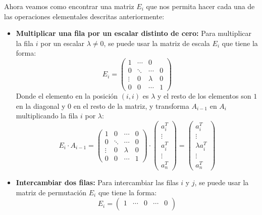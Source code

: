 \begin{proposición}
    Ahora veamos como encontrar una matriz $E_i$ que nos permita hacer cada una de las operaciones elementales descritas anteriormente:
    \begin{itemize}
        \item \textbf{Multiplicar una fila por un escalar distinto de cero:} Para multiplicar la fila $i$ por un escalar $\lambda \neq 0$, se puede usar la matriz de escala $E_i$ que tiene la forma:
        \[
            E_i = \begin{pmatrix}
                1 & \cdots & 0 \\ 
                0 & \ddots & \cdots & 0 
                \\ \vdots & 0 & \lambda & 0 
                \\ 0 & 0 & \cdots & 1 
            \end{pmatrix}
        \]
        Donde el elemento en la posición $(i,i)$ es $\lambda$ y el resto de los elementos son $1$ en la diagonal y $0$ en el resto de la matriz, y transforma $A_{i-1}$ en $A_i$ multiplicando la fila $i$ por $\lambda$:
        \[
            E_i \cdot A_{i-1} =
            \begin{pmatrix}
                1 & 0 & \cdots & 0 \\ 
                0 & \ddots & \cdots & 0 
                \\ \vdots & 0 & \lambda & 0 
                \\ 0 & 0 & \cdots & 1
            \end{pmatrix}
            \cdot \begin{pmatrix}
                a_i^T \\ \vdots \\ a_i^T \\ \vdots \\ a_n^T 
            \end{pmatrix} =
            \begin{pmatrix}
                a_i^T \\ \vdots \\ \lambda a_i^T \\ \vdots \\ a_n^T
            \end{pmatrix}
        \]
        \item \textbf{Intercambiar dos filas:} Para intercambiar las filas $i$ y $j$, se puede usar la matriz de permutación $E_i$ que tiene la forma:
        \[
            E_i = \begin{pmatrix}
                1 & \cdots & 0 & \cdots & 0 \\ 

\end{pmatrix}\]
\end{itemize}
\end{proposición}

